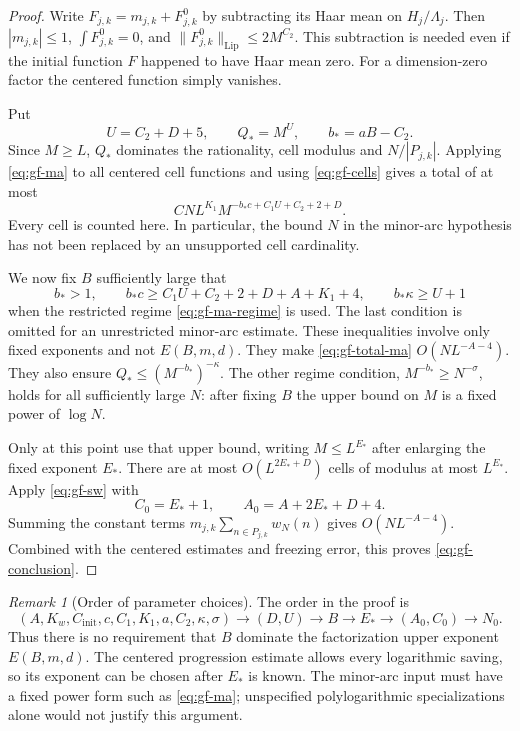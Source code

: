 \documentclass[11pt]{article}
\theoremstyle{definition}
\theoremstyle{remark}
\newtheorem{remark}[theorem]{Remark}
\begin{document}
\begin{proof}
Write $F_{j,k}=m_{j,k}+F_{j,k}^0$ by subtracting its Haar mean on
$H_j/\Lambda_j$. Then $|m_{j,k}|\leq1$,
$\int F_{j,k}^0=0$, and
$\|F_{j,k}^0\|_{\mathrm{Lip}}\leq2M^{C_2}$. This subtraction is needed
even if the initial function $F$ happened to have Haar mean zero.
For a dimension-zero factor the centered function simply vanishes.

Put
\[
 U=C_2+D+5,\qquad Q_*=M^U,\qquad b_*=aB-C_2.
\]
Since $M\geq L$, $Q_*$ dominates the rationality, cell modulus and
$N/|P_{j,k}|$. Applying \eqref{eq:gf-ma} to all centered cell functions
and using \eqref{eq:gf-cells} gives a total of at most
\begin{equation}\label{eq:gf-total-ma}
 C N L^{K_1}M^{-b_*c+C_1U+C_2+2+D}.
\end{equation}
Every cell is counted here. In particular, the bound $N$ in the
minor-arc hypothesis has not been replaced by an unsupported cell
cardinality.

We now fix $B$ sufficiently large that
\begin{equation}\label{eq:gf-choice-B}
 b_*>1,\qquad
 b_*c\geq C_1U+C_2+2+D+A+K_1+4,
 \qquad b_*\kappa\geq U+1
\end{equation}
when the restricted regime \eqref{eq:gf-ma-regime} is used. The last
condition is omitted for an unrestricted minor-arc estimate. These
inequalities involve only fixed exponents and not $E(B,m,d)$.
They make \eqref{eq:gf-total-ma} $O(NL^{-A-4})$. They also ensure
$Q_*\leq(M^{-b_*})^{-\kappa}$. The other regime condition,
$M^{-b_*}\geq N^{-\sigma}$, holds for all sufficiently large $N$:
after fixing $B$ the upper bound on $M$ is a fixed power of $\log N$.

Only at this point use that upper bound, writing $M\leq L^{E_*}$ after
enlarging the fixed exponent $E_*$. There are at most
$O(L^{2E_*+D})$ cells of modulus at most $L^{E_*}$. Apply
\eqref{eq:gf-sw} with
\[
 C_0=E_*+1,\qquad A_0=A+2E_*+D+4.
\]
Summing the constant terms $m_{j,k}\sum_{n\in P_{j,k}}w_N(n)$ gives
$O(NL^{-A-4})$. Combined with the centered estimates and freezing error,
this proves \eqref{eq:gf-conclusion}.
\end{proof}

\begin{remark}[Order of parameter choices]\label{rem:gf-order}
The order in the proof is
\[
 (A,K_w,C_{\mathrm{init}},c,C_1,K_1,a,C_2,\kappa,\sigma)
 \longrightarrow (D,U)\longrightarrow B\longrightarrow E_*
 \longrightarrow(A_0,C_0)\longrightarrow N_0.
\]
Thus there is no requirement that $B$ dominate the factorization upper
exponent $E(B,m,d)$. The centered progression estimate allows every
logarithmic saving, so its exponent can be chosen after $E_*$ is known.
The minor-arc input must have a fixed power form such as
\eqref{eq:gf-ma}; unspecified polylogarithmic specializations alone
would not justify this argument.
\end{remark}
\end{document}
